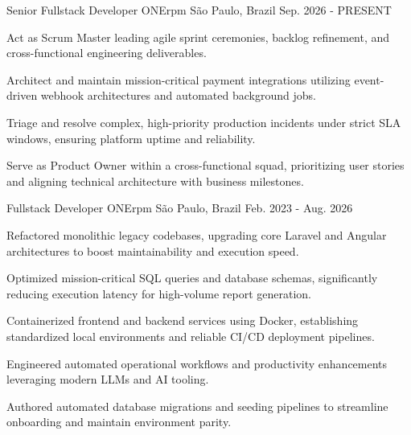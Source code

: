 

\begin{cventries}

  \cventry
    {Senior Fullstack Developer} %
    {ONErpm} %
    {São Paulo, Brazil} %
    {Sep. 2026 - PRESENT} %
    {
      \begin{cvitems} %
        \item {Act as Scrum Master leading agile sprint ceremonies, backlog refinement, and cross-functional engineering deliverables.}
        \item {Architect and maintain mission-critical payment integrations utilizing event-driven webhook architectures and automated background jobs.}
        \item {Triage and resolve complex, high-priority production incidents under strict SLA windows, ensuring platform uptime and reliability.}
        \item {Serve as Product Owner within a cross-functional squad, prioritizing user stories and aligning technical architecture with business milestones.}
      \end{cvitems}
    }

  \cventry
    {Fullstack Developer} %
    {ONErpm} %
    {São Paulo, Brazil} %
    {Feb. 2023 - Aug. 2026} %
    {
      \begin{cvitems} %
        \item {Refactored monolithic legacy codebases, upgrading core Laravel and Angular architectures to boost maintainability and execution speed.}
        \item {Optimized mission-critical SQL queries and database schemas, significantly reducing execution latency for high-volume report generation.}
        \item {Containerized frontend and backend services using Docker, establishing standardized local environments and reliable CI/CD deployment pipelines.}
        \item {Engineered automated operational workflows and productivity enhancements leveraging modern LLMs and AI tooling.}
        \item {Authored automated database migrations and seeding pipelines to streamline onboarding and maintain environment parity.}
      \end{cvitems}
    }


\end{cventries}
